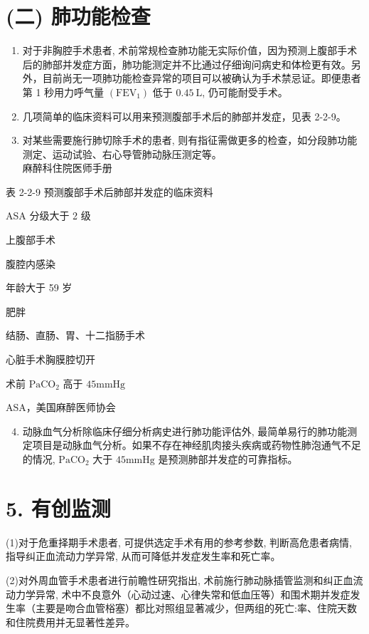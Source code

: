 \documentclass[10pt]{article}
\begin{document}
\section*{(二) 肺功能检查}
\begin{enumerate}
  \item 对于非胸腔手术患者, 术前常规检查肺功能无实际价值，因为预测上腹部手术后的肺部并发症方面，肺功能测定并不比通过仔细询问病史和体检更有效。另外，目前尚无一项肺功能检查异常的项目可以被确认为手术禁忌证。即便患者第 1 秒用力呼气量 $\left(\mathrm{FEV}_{1}\right)$ 低于 $0.45 \mathrm{~L}$, 仍可能耐受手术。

  \item 几项简单的临床资料可以用来预测腹部手术后的肺部并发症，见表 2-2-9。

  \item 对某些需要施行肺切除手术的患者, 则有指征需做更多的检查，如分段肺功能测定、运动试验、右心导管肺动脉压测定等。\\
麻醉科住院医师手册

\end{enumerate}

表 2-2-9 预测腹部手术后肺部并发症的临床资料

ASA 分级大于 2 级

上腹部手术

腹腔内感染

年龄大于 59 岁

肥胖

结肠、直肠、胃、十二指肠手术

心脏手术胸膜腔切开

术前 $\mathrm{PaCO}_{2}$ 高于 $45 \mathrm{mmHg}$

ASA，美国麻醉医师协会

\begin{enumerate}
  \setcounter{enumi}{3}
  \item 动脉血气分析除临床仔细分析病史进行肺功能评估外, 最简单易行的肺功能测定项目是动脉血气分析。如果不存在神经肌肉接头疾病或药物性肺泡通气不足的情况, $\mathrm{PaCO}_{2}$ 大于 $45 \mathrm{mmHg}$ 是预测肺部并发症的可靠指标。
\end{enumerate}

\section*{5. 有创监测}
(1)对于危重择期手术患者, 可提供选定手术有用的参考参数, 判断高危患者病情, 指导纠正血流动力学异常, 从而可降低并发症发生率和死亡率。

(2)对外周血管手术患者进行前瞻性研究指出, 术前施行肺动脉插管监测和纠正血流动力学异常, 术中不良意外（心动过速、心律失常和低血压等）和围术期并发症发生率（主要是吻合血管㭲塞）都比对照组显著减少，但两组的死亡:率、住院天数和住院费用并无显著性差异。
\end{document}
